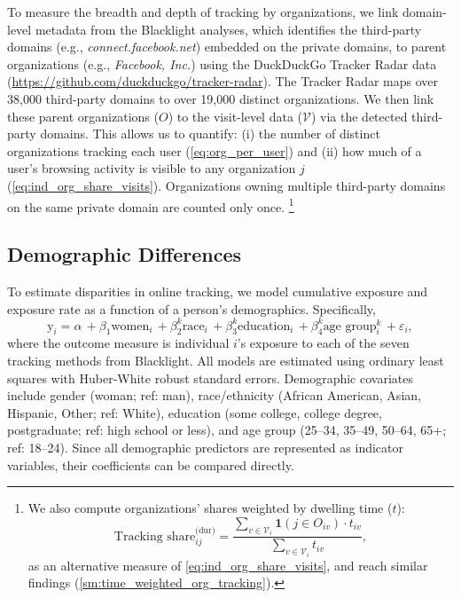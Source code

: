 \documentclass[12pt, letterpaper]{article}
\begin{document}
To measure the breadth and depth of tracking by organizations, we link domain-level metadata from the Blacklight analyses, which identifies the third-party domains (e.g., \textit{connect.facebook.net}) embedded on the private domains, to parent organizations (e.g., \textit{Facebook, Inc.}) using the DuckDuckGo Tracker Radar data (\url{https://github.com/duckduckgo/tracker-radar}).
The Tracker Radar maps over 38,000 third-party domains to over 19,000 distinct organizations. We then link these parent organizations ($O$) to the visit-level data ($\mathcal{V}$) via the detected third-party domains. This allows us to quantify: (i) the number of distinct organizations tracking each user (\cref{eq:org_per_user}) and (ii) how much of a user's browsing activity is visible to any organization $j$ (\cref{eq:ind_org_share_visits}). Organizations owning multiple third-party domains on the same private domain are counted only once.%
\footnote{
    We also compute organizations' shares weighted by dwelling time ($t$):
    \begin{equation}\label{eq:ind_org_share_duration}
        \text{Tracking share}_{ij}^{\text{(dur)}} = 
        \frac{
            \sum_{v \in \mathcal{V}_i} 
            \mathbf{1}
            (j \in O_{iv})
            \cdot
            t_{iv}
        }
        {
            \sum_{v \in \mathcal{V}_i} 
            t_{iv}
        },
    \end{equation}
    as an alternative measure of \cref{eq:ind_org_share_visits}, and reach similar findings (\cref{sm:time_weighted_org_tracking}).
}


\subsection{Demographic Differences}\label{sec:demo_diff}
To estimate disparities in online tracking, we model cumulative exposure and exposure rate as a function of a person's demographics. Specifically, 
\begin{equation}\label{eq:demo-diff}
     \text{y}_i =
     \alpha
     \, + \beta_1   \text{women}_i
     \, + \beta_2^k \text{race}_i
     \, + \beta_3^k \text{education}_i
     \, + \beta_4^k \text{age group}_i^k
     \, + \varepsilon_i,
\end{equation}
where the outcome measure is individual $i$'s exposure to each of the seven tracking methods from Blacklight. All models are estimated using ordinary least squares with Huber-White robust standard errors. Demographic covariates include gender (woman; ref: man), race/ethnicity (African American, Asian, Hispanic, Other; ref: White), education (some college, college degree, postgraduate; ref: high school or less), and age group (25–34, 35–49, 50–64, 65+; ref: 18–24). Since all demographic predictors are represented as indicator variables, their coefficients can be compared directly.
\end{document}
